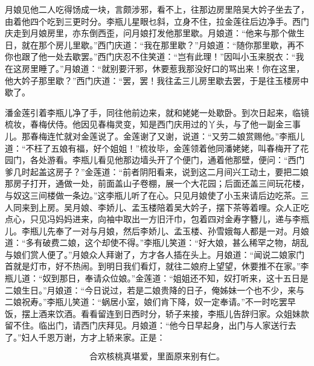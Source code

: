 月娘见他二人吃得饧成一块，言颇涉邪，看不上，往那边房里陪吴大妗子坐去了，由着他四个吃到三更时分。李瓶儿星眼乜斜，立身不住，拉金莲往后边净手。西门庆走到月娘房里，亦东倒西歪，问月娘打发他那里歇。月娘道：“他来与那个做生日，就在那个房儿里歇。”西门庆道：“我在那里歇？”月娘道：“随你那里歇，再不你也跟了他一处去歇罢。”西门庆忍不住笑道：“岂有此理！”因叫小玉来脱衣：“我在这房里睡了。”月娘道：“就别要汗邪，休要惹我那没好口的骂出来！你在这里，他大妗子那里歇？”西门庆道：“罢，罢！我往孟三儿房里歇去罢，于是往玉楼房中歇了。

潘金莲引着李瓶儿净了手，同往他前边来，就和姥姥一处歇卧。到次日起来，临镜梳妆，春梅伏侍。他因见春梅灵变，知是西门庆用过的丫头，与了他一副金三事儿。那春梅连忙就对金莲说了。金莲谢了又谢，说道：“又劳二娘赏赐他。”李瓶儿道：“不枉了五娘有福，好个姐姐！”梳妆毕，金莲领着他同潘姥姥，叫春梅开了花园门，各处游看。李瓶儿看见他那边墙头开了个便门，通着他那壁，便问：“西门爹几时起盖这房子？”金莲道：“前者阴阳看来，说到这二月间兴工动土，要把二娘那房子打开，通做一处，前面盖山子卷棚，展一个大花园；后面还盖三间玩花楼，与奴这三间楼做一条边。”这李瓶儿听了在心。只见月娘使了小玉来请后边吃茶。三人同来到上房。吴月娘、李娇儿、孟玉楼陪着吴大妗子，摆下茶等着哩。众人正吃点心，只见冯妈妈进来，向袖中取出一方旧汗巾，包着四对金寿字簪儿，递与李瓶儿。李瓶儿先奉了一对与月娘，然后李娇儿、孟玉楼、孙雪娥每人都是一对。月娘道：“多有破费二娘，这个却使不得。”李瓶儿笑道：“好大娘，甚么稀罕之物，胡乱与娘们赏人便了。”月娘众人拜谢了，方才各人插在头上。月娘道：“闻说二娘家门首就是灯市，好不热闹。到明日我们看灯，就往二娘府上望望，休要推不在家。”李瓶儿道：“奴到那日，奉请众位娘。”金莲道：“姐姐还不知，奴打听来，这十五日是二娘生日。”月娘道：“今日说过，若是二娘贵降的日子，俺姊妹一个也不少，来与二娘祝寿。”李瓶儿笑道：“蜗居小室，娘们肯下降，奴一定奉请。”不一时吃罢早饭，摆上酒来饮酒。看看留连到日西时分，轿子来接，李瓶儿告辞归家。众姐妹款留不住。临出门，请西门庆拜见。月娘道：“他今日早起身，出门与人家送行去了。”妇人千恩万谢，方才上轿来家。正是：

\[
合欢核桃真堪爱，里面原来别有仁。
\]
